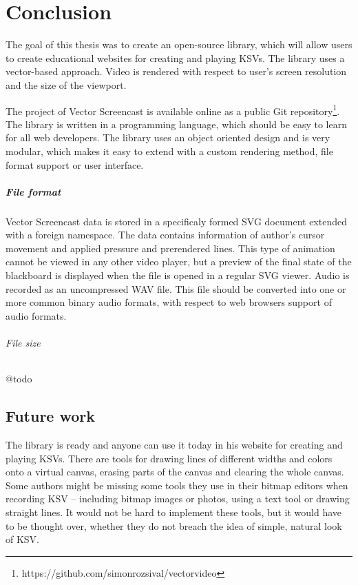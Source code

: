 \chapter*{Conclusion}

The goal of this thesis was to create an open-source library, which will allow users to create educational websites for creating and playing KSVs. The library uses a vector-based approach. Video is rendered with respect to user's screen resolution and the size of the viewport.

The project of Vector Screencast is available online as a public Git repository\footnote{https://github.com/simonrozsival/vectorvideo}. The library is written in a programming language, which should be easy to learn for all web developers. The library uses an object oriented design and is very modular, which makes it easy to extend with a custom rendering method, file format support or user interface.

\paragraph{File format} Vector Screencast data is stored in a specificaly formed SVG document extended with a foreign namespace. The data contains information of author's cursor movement and applied pressure and prerendered lines. This type of animation cannot be viewed in any other video player, but a preview of the final state of the blackboard is displayed when the file is opened in a regular SVG viewer. Audio is recorded as an uncompressed WAV file. This file should be converted into one or more common binary audio formats, with respect to web browsers support of audio formats. 

\subparagraph{File size}
@todo

\section{Future work}
The library is ready and anyone can use it today in his website for creating and playing KSVs. There are tools for drawing lines of different widths and colors onto a virtual canvas, erasing parts of the canvas and clearing the whole canvas. Some authors might be missing some tools they use in their bitmap editors when recording KSV -- including bitmap images or photos, using a text tool or drawing straight lines. It would not be hard to implement these tools, but it would have to be thought over, whether they do not breach the idea of simple, natural look of KSV.

